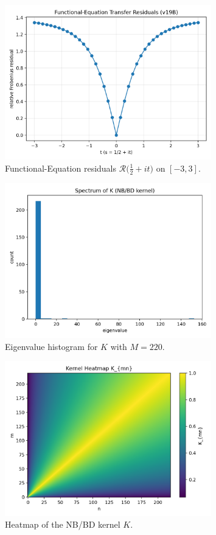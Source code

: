 \documentclass[11pt]{article}
\begin{document}
\begin{figure}[h]
  \centering
  \includegraphics[width=0.8\textwidth]{v19B_out/figure_residuals.png}
  \caption{Functional-Equation residuals \(\mathcal{R}\big(\tfrac12+it\big)\) on \([-3,3]\).}
  \label{fig:res}
\end{figure}

\begin{figure}[h]
  \centering
  \includegraphics[width=0.8\textwidth]{v19B_out/figure_spectrum.png}
  \caption{Eigenvalue histogram for \(K\) with \(M=220\).}
  \label{fig:spec}
\end{figure}

\begin{figure}[h]
  \centering
  \includegraphics[width=0.8\textwidth]{v19B_out/figure_heatmap.png}
  \caption{Heatmap of the NB/BD kernel \(K\).}
  \label{fig:heat}
\end{figure}
\end{document}
